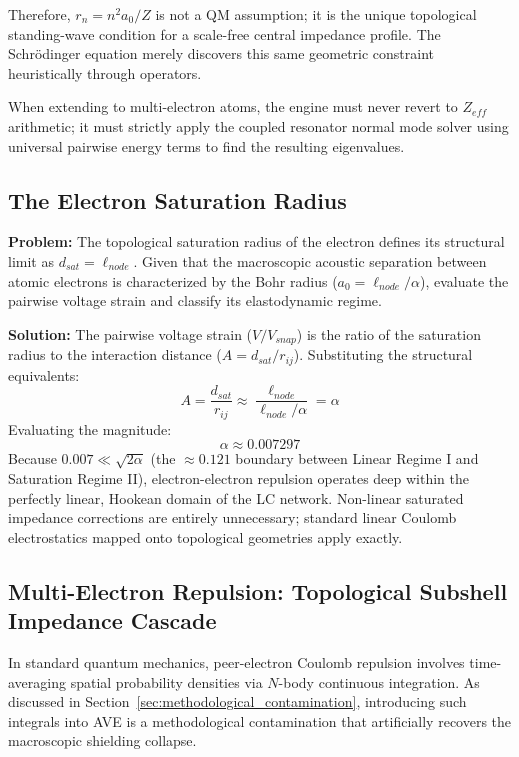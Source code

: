 Therefore, $r_n = n^2 a_0 / Z$ is not a QM assumption; it is the unique topological standing-wave condition for a scale-free central impedance profile. The Schrödinger equation merely discovers this same geometric constraint heuristically through operators.

When extending to multi-electron atoms, the engine must never revert to $Z_{eff}$ arithmetic; it must strictly apply the coupled resonator normal mode solver using universal pairwise energy terms to find the resulting eigenvalues.

\subsection{The Electron Saturation Radius}

\begin{examplebox}
\textbf{Problem:} The topological saturation radius of the electron defines its structural limit as $d_{sat} = \ell_{node}$. Given that the macroscopic acoustic separation between atomic electrons is characterized by the Bohr radius ($a_0 = \ell_{node}/\alpha$), evaluate the pairwise voltage strain and classify its elastodynamic regime.

\textbf{Solution:} The pairwise voltage strain ($V/V_{snap}$) is the ratio of the saturation radius to the interaction distance ($A = d_{sat} / r_{ij}$). Substituting the structural equivalents:
\[ A = \frac{d_{sat}}{r_{ij}} \approx \frac{\ell_{node}}{\ell_{node}/\alpha} = \alpha \]
Evaluating the magnitude:
\[ \alpha \approx 0.007297 \]
Because $0.007 \ll \sqrt{2\alpha}$ (the $\approx 0.121$ boundary between Linear Regime I and Saturation Regime II), electron-electron repulsion operates deep within the perfectly linear, Hookean domain of the LC network. Non-linear saturated impedance corrections are entirely unnecessary; standard linear Coulomb electrostatics mapped onto topological geometries apply exactly.
\end{examplebox}

\subsection{Multi-Electron Repulsion: Topological Subshell Impedance Cascade}

In standard quantum mechanics, peer-electron Coulomb repulsion involves time-averaging spatial probability densities via $N$-body continuous integration. As discussed in Section~\ref{sec:methodological_contamination}, introducing such integrals into AVE is a methodological contamination that artificially recovers the macroscopic shielding collapse.

